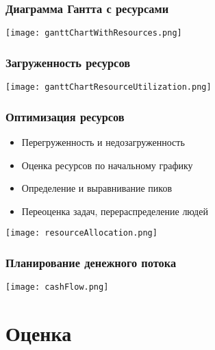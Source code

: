 \documentclass{../../slides-style}
\begin{document}
    \begin{frame}
        \frametitle{Диаграмма Гантта с ресурсами}
        \begin{center}
            \texttt{[image: ganttChartWithResources.png]}
        \end{center}
    \end{frame}

    \begin{frame}
        \frametitle{Загруженность ресурсов}
        \begin{center}
            \texttt{[image: ganttChartResourceUtilization.png]}
        \end{center}
    \end{frame}

    \begin{frame}
        \frametitle{Оптимизация ресурсов}
        \begin{itemize}
            \item Перегруженность и недозагруженность
            \item Оценка ресурсов по начальному графику
            \item Определение и выравнивание пиков
            \item Переоценка задач, перераспределение людей
        \end{itemize}
        \begin{center}
            \texttt{[image: resourceAllocation.png]}
        \end{center}
    \end{frame}

    \begin{frame}
        \frametitle{Планирование денежного потока}
        \begin{center}
            \texttt{[image: cashFlow.png]}
        \end{center}
    \end{frame}

    \section{Оценка}
\end{document}
